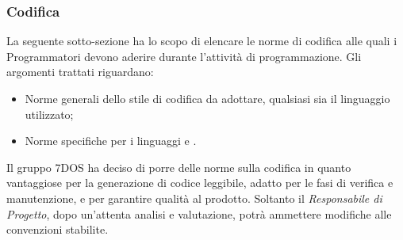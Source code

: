 \subsubsection{Codifica}
La seguente sotto-sezione ha lo scopo di elencare le norme di codifica alle quali i Programmatori devono aderire durante l'attività di programmazione. Gli argomenti trattati riguardano:
\begin{itemize}
 \item{Norme generali dello stile di codifica da adottare, qualsiasi sia il linguaggio utilizzato;}
 \item{Norme specifiche per i linguaggi    e .}
\end{itemize}
Il gruppo 7DOS ha deciso di porre delle norme sulla codifica in quanto vantaggiose per la generazione di codice leggibile, adatto per le fasi di verifica e manutenzione, e per garantire qualità al prodotto.
Soltanto il \emph{Responsabile di Progetto}, dopo un'attenta analisi e valutazione, potrà ammettere modifiche alle convenzioni stabilite.\\
